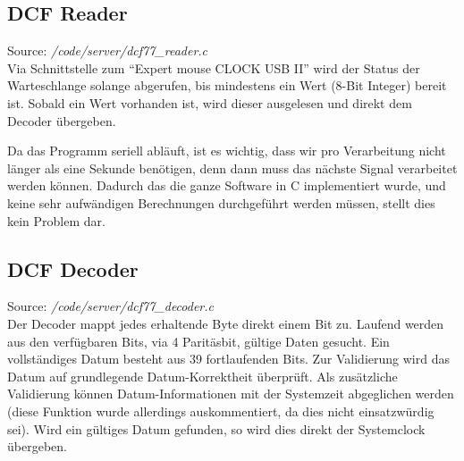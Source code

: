 \subsection{DCF Reader}
Source: \textit{/code/server/dcf77\_reader.c}\\
Via Schnittstelle zum "`Expert mouse CLOCK USB II"' wird der Status der Warteschlange  solange abgerufen, bis mindestens ein Wert (8-Bit Integer) bereit ist.
Sobald ein Wert vorhanden ist, wird dieser ausgelesen und direkt dem Decoder übergeben.

Da das Programm seriell abläuft, ist es wichtig, dass wir pro Verarbeitung nicht länger als eine Sekunde benötigen, denn dann muss das nächste Signal verarbeitet werden können.
Dadurch das die ganze Software in C implementiert wurde, und keine sehr aufwändigen Berechnungen durchgeführt werden müssen, stellt dies kein Problem dar.

\subsection{DCF Decoder}
Source: \textit{/code/server/dcf77\_decoder.c}\\
Der Decoder mappt jedes erhaltende Byte direkt einem Bit zu. Laufend werden aus den verfügbaren Bits, via 4 Paritäsbit, gültige Daten gesucht. Ein vollständiges Datum besteht aus 39 fortlaufenden Bits. Zur Validierung wird das Datum auf grundlegende Datum-Korrektheit überprüft. Als zusätzliche Validierung können Datum-Informationen mit der Systemzeit abgeglichen werden (diese Funktion wurde allerdings auskommentiert, da dies nicht einsatzwürdig sei).
Wird ein gültiges Datum gefunden, so wird dies direkt der Systemclock übergeben.

